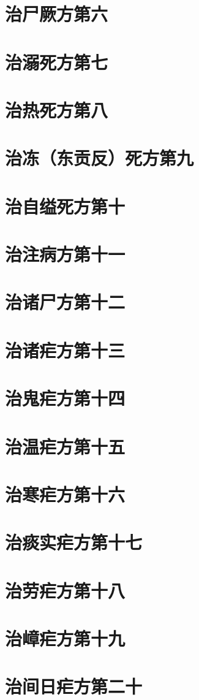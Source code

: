 \documentclass[a4paper,12pt,UTF8,twoside]{ctexbook}
\begin{document}
\chapter{治尸厥方第六}
\chapter{治溺死方第七}
\chapter{治热死方第八}
\chapter{治冻（东贡反）死方第九}
\chapter{治自缢死方第十}
\chapter{治注病方第十一}
\chapter{治诸尸方第十二}
\chapter{治诸疟方第十三}
\chapter{治鬼疟方第十四}
\chapter{治温疟方第十五}
\chapter{治寒疟方第十六}
\chapter{治痰实疟方第十七}
\chapter{治劳疟方第十八}
\chapter{治嶂疟方第十九}
\chapter{治间日疟方第二十}
\end{document}
